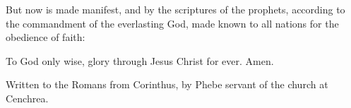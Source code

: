 {But
now is made
manifest,
and
by the
scriptures of the
prophets, according
to the
commandment of
the
everlasting
God, made
known
to
all
nations
for the
obedience of
faith:

To
God
only
wise,
{}
glory
through
Jesus
Christ
for
ever.
Amen.


\par }{\SH Written to the Romans from Corinthus,
{} by Phebe servant of the church at Cenchrea.
\par }
